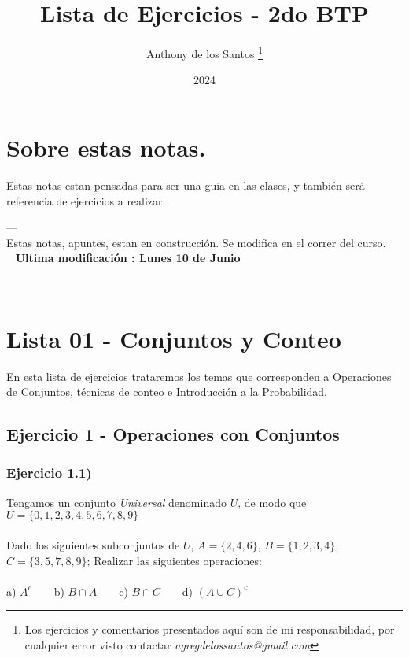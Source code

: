 \documentclass[11pt, a4paper]{article}
\title{ {\color{blue} Lista de Ejercicios - 2do BTP} }
\author{ Anthony de los Santos \footnote{ Los ejercicios y comentarios presentados aqu\'i son de mi responsabilidad, por cualquier
error visto contactar  \textit{agregdelossantos@gmail.com} } }
\date{ 2024 }
\begin{document}
\maketitle

\newpage

\tableofcontents

\newpage


\vspace{20px}

\section{ Sobre estas notas. }

Estas notas estan pensadas para ser una guia en las clases, y tambi\'en ser\'a referencia 
de ejercicios a realizar. 

--- \\
Estas notas, apuntes, estan en construcci\'on. Se modifica en el correr del curso. ~ ~ \textbf{ {\color{red} Ultima modificaci\'on : Lunes 10 de Junio } }

--- \\



\section{ Lista 01 - Conjuntos y Conteo }

En esta lista de ejercicios trataremos los temas que corresponden a Operaciones de Conjuntos, t\'ecnicas de conteo e Introducci\'on a la Probabilidad.  \\

\subsection*{ Ejercicio 1 - Operaciones con Conjuntos }
\subsubsection*{ Ejercicio 1.1) }
Tengamos un conjunto \textit{Universal} denominado $U$, de modo que $U = \{ 0,1,2,3,4,5,6,7,8,9 \}$ \\ \\
Dado los siguientes {\color{blue} subconjuntos} de $U$,  $A = \{ 2,4,6 \} $, $B = \{1,2,3,4\} $, \\ $C = \{ 3,5,7,8,9 \}$; Realizar las siguientes operaciones: \\ \\ 
a) $ A^c $ ~ ~ b) $ B \cap A $ ~ ~ c) $ B \cap C $ ~ ~  d) $ (A \cup C)^c$
\end{document}

